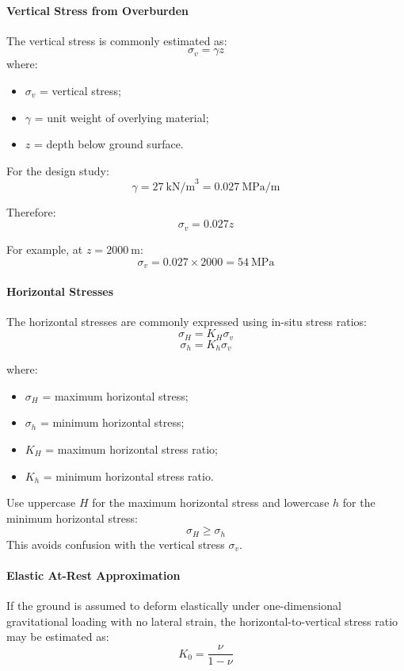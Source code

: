 \paragraph{Vertical Stress from Overburden}

The vertical stress is commonly estimated as:
\[
\sigma_v = \gamma z
\]
where:
\begin{itemize}
 \item \(\sigma_v\) = vertical stress;
 \item \(\gamma\) = unit weight of overlying material;
 \item \(z\) = depth below ground surface.
\end{itemize}

For the design study:
\[
\gamma = 27~\text{kN/m}^3 = 0.027~\text{MPa/m}
\]

Therefore:
\[
\sigma_v = 0.027z
\]

For example, at \(z=2000~\text{m}\):
\[
\sigma_v = 0.027 \times 2000 = 54~\text{MPa}
\]

\paragraph{Horizontal Stresses}

The horizontal stresses are commonly expressed using in-situ stress ratios:
\[
\sigma_H = K_H \sigma_v
\]
\[
\sigma_h = K_h \sigma_v
\]

where:
\begin{itemize}
 \item \(\sigma_H\) = maximum horizontal stress;
 \item \(\sigma_h\) = minimum horizontal stress;
 \item \(K_H\) = maximum horizontal stress ratio;
 \item \(K_h\) = minimum horizontal stress ratio.
\end{itemize}

\begin{notebox}[Notation]
Use uppercase \(H\) for the maximum horizontal stress and lowercase \(h\) for the
minimum horizontal stress:
\[
\sigma_H \geq \sigma_h
\]
This avoids confusion with the vertical stress \(\sigma_v\).
\end{notebox}

\paragraph{Elastic At-Rest Approximation}

If the ground is assumed to deform elastically under one-dimensional gravitational loading
with no lateral strain, the horizontal-to-vertical stress ratio may be estimated as:
\[
K_0 = \frac{\nu}{1-\nu}
\]

